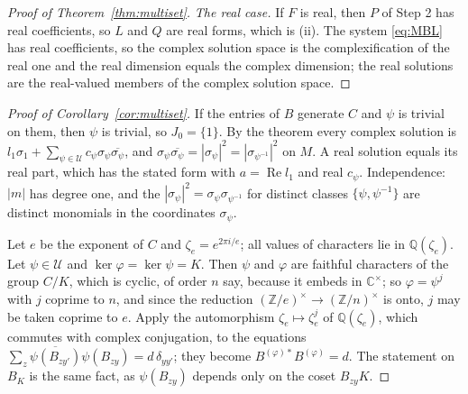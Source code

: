 \begin{proof}[Proof of Theorem~\ref{thm:multiset}]
\emph{The real case.} If $F$ is real, then $P$ of Step 2 has real coefficients, so $L$ and $Q$ are real forms, which is (ii). The system \eqref{eq:MBL} has real coefficients, so the complex solution space is the complexification of the real one and the real dimension equals the complex dimension; the real solutions are the real-valued members of the complex solution space.
\end{proof}

\begin{proof}[Proof of Corollary~\ref{cor:multiset}]
If the entries of $B$ generate $C$ and $\psi$ is trivial on them, then $\psi$ is trivial, so $J_0=\{1\}$. By the theorem every complex solution is $l_1\sigma_1+\sum_{\psi\in \mathcal{U}}c_\psi\sigma_\psi\overline{\sigma_\psi}$, and $\sigma_\psi\overline{\sigma_\psi}=|\sigma_\psi|^2=|\sigma_{\psi^{-1}}|^2$ on $M$. A real solution equals its real part, which has the stated form with $a=\operatorname{Re}l_1$ and real $c_\psi$. Independence: $|m|$ has degree one, and the $|\sigma_\psi|^2=\sigma_\psi\sigma_{\psi^{-1}}$ for distinct classes $\{\psi,\psi^{-1}\}$ are distinct monomials in the coordinates $\sigma_\psi$.

Let $e$ be the exponent of $C$ and $\zeta_e=e^{2\pi i/e}$; all values of characters lie in $\mathbb{Q}(\zeta_e)$. Let $\psi\in\mathcal{U}$ and $\ker\varphi=\ker\psi=K$. Then $\psi$ and $\varphi$ are faithful characters of the group $C/K$, which is cyclic, of order $n$ say, because it embeds in $\mathbb{C}^\times$; so $\varphi=\psi^j$ with $j$ coprime to $n$, and since the reduction $(\mathbb{Z}/e)^\times\to(\mathbb{Z}/n)^\times$ is onto, $j$ may be taken coprime to $e$. Apply the automorphism $\zeta_e\mapsto\zeta_e^j$ of $\mathbb{Q}(\zeta_e)$, which commutes with complex conjugation, to the equations $\sum_z\overline{\psi(B_{zy'})}\psi(B_{zy})=d\,\delta_{yy'}$; they become $B^{(\varphi)*}B^{(\varphi)}=d$. The statement on $B_K$ is the same fact, as $\psi(B_{zy})$ depends only on the coset $B_{zy}K$.


\end{proof}
